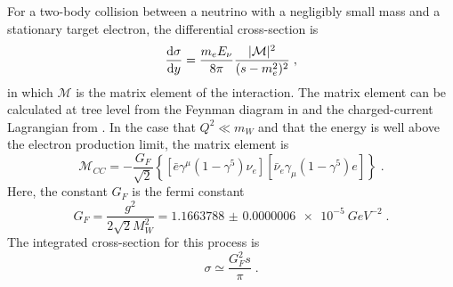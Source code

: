 For a two-body collision between a neutrino with a negligibly small mass and a stationary target electron, the differential cross-section is
\begin{equation}
    \frac{\mathrm{d} \sigma}{\mathrm{d} y} = \frac{m_e E_\nu}{8\pi}\frac{|\mathcal{M}|^2}{(s-m_e^2)^2}\;,
\end{equation}
in which $\mathcal{M}$ is the matrix element of the interaction.
The matrix element can be calculated at tree level from the Feynman diagram in  and the charged-current Lagrangian from .
In the case that $Q^2 \ll m_W$ and that the energy is well above the electron production limit, the matrix element is
\begin{equation}
    \mathcal{M}_{CC} = -\frac{G_F}{\sqrt{2}}\left\{ [\bar{e}\gamma^\mu(1-\gamma^5)\nu_e][\bar{\nu}_e\gamma_\mu(1-\gamma^5)e] \right\}\;.
\end{equation}
Here, the constant $G_F$ is the fermi constant\cite{pdg}
\begin{equation}
    G_F = \frac{g^2}{2\sqrt{2}M_W^2} = \SI{1.1663788(6)e-5}{GeV^{-2}}\;.
\end{equation}
The integrated cross-section for this process is
\begin{equation}
    \sigma \simeq \frac{G^2_F s}{\pi}\;.
\end{equation}


